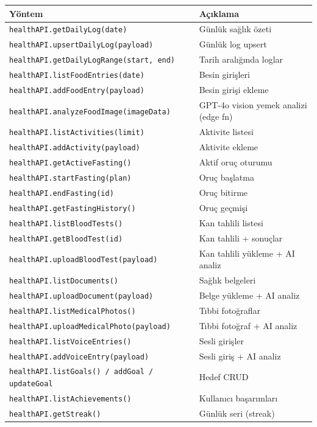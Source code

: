 \begin{table}[H]
\centering
\small
\begin{tabular}{|l|p{}|}
\hline
\textbf{Yöntem} & \textbf{Açıklama} \\
\hline
\texttt{healthAPI.getDailyLog(date)}            & Günlük sağlık özeti \\
\texttt{healthAPI.upsertDailyLog(payload)}      & Günlük log upsert \\
\texttt{healthAPI.getDailyLogRange(start, end)} & Tarih aralığında loglar \\
\texttt{healthAPI.listFoodEntries(date)}        & Besin girişleri \\
\texttt{healthAPI.addFoodEntry(payload)}        & Besin girişi ekleme \\
\texttt{healthAPI.analyzeFoodImage(imageData)}  & GPT-4o vision yemek analizi (edge fn) \\
\texttt{healthAPI.listActivities(limit)}        & Aktivite listesi \\
\texttt{healthAPI.addActivity(payload)}         & Aktivite ekleme \\
\texttt{healthAPI.getActiveFasting()}           & Aktif oruç oturumu \\
\texttt{healthAPI.startFasting(plan)}           & Oruç başlatma \\
\texttt{healthAPI.endFasting(id)}               & Oruç bitirme \\
\texttt{healthAPI.getFastingHistory()}          & Oruç geçmişi \\
\texttt{healthAPI.listBloodTests()}             & Kan tahlili listesi \\
\texttt{healthAPI.getBloodTest(id)}             & Kan tahlili + sonuçlar \\
\texttt{healthAPI.uploadBloodTest(payload)}     & Kan tahlili yükleme + AI analiz \\
\texttt{healthAPI.listDocuments()}              & Sağlık belgeleri \\
\texttt{healthAPI.uploadDocument(payload)}      & Belge yükleme + AI analiz \\
\texttt{healthAPI.listMedicalPhotos()}          & Tıbbi fotoğraflar \\
\texttt{healthAPI.uploadMedicalPhoto(payload)}  & Tıbbi fotoğraf + AI analiz \\
\texttt{healthAPI.listVoiceEntries()}           & Sesli girişler \\
\texttt{healthAPI.addVoiceEntry(payload)}       & Sesli giriş + AI analiz \\
\texttt{healthAPI.listGoals() / addGoal / updateGoal} & Hedef CRUD \\
\texttt{healthAPI.listAchievements()}           & Kullanıcı başarımları \\
\texttt{healthAPI.getStreak()}                  & Günlük seri (streak) \\
\hline
\end{tabular}
\end{table}

